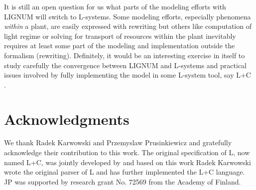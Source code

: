 It is still an open question for us what parts of the modeling efforts
with  LIGNUM  will  switch   to  L-systems.   Some  modeling  efforts,
especially phenomena  {\it within} a plant, are  easily expressed with
rewriting but  others like computation  of light regime or  solving for
transport of  resources within the plant inevitably  requires at least
some  part of the  modeling and  implementation outside  the formalism
(rewriting).   Definitely,  it would  be  an  interesting exercise  in
itself to study carefully the convergence between LIGNUM and L-systems
and practical issues involved by  fully implementing the model in some
L-system tool, say L+C \citep{karwowski:02}.

\section{Acknowledgments}

We thank  Radek Karwowski and Przemyslaw  Prusinkiewicz and gratefully
acknowledge   their   contribution  to   this   work.   The   original
specification  of   L,  now  named  L+C,  was   jointly  developed  by
\citet{pp:99}  and  based  on  this  work Radek  Karwowski  wrote  the
original parser of L and  has further implemented the L+C language. JP
was supported by research grant No. 72569 from the Academy of Finland.
 